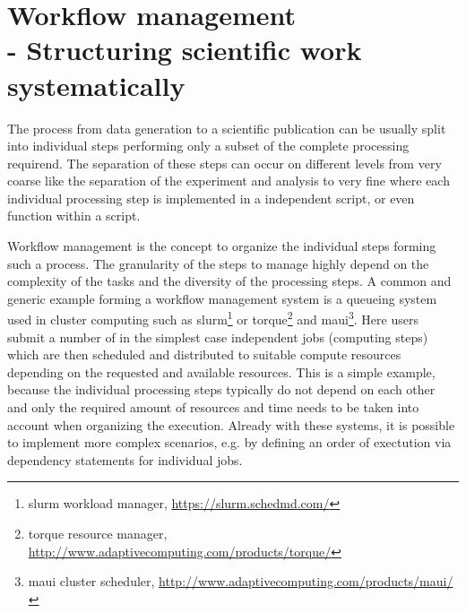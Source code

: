 \clearpage
\chapter[Workflow management]{Workflow management\\- Structuring scientific work systematically}
\label{sec:workflows}
The process from data generation to a scientific publication can be usually split into individual steps performing only a subset of the complete processing requirend. The separation of these steps can occur on different levels from very coarse like the separation of the experiment and analysis to very fine where each individual processing step is implemented in a independent script, or even function within a script.

Workflow management is the concept to organize the individual steps forming such a process. The granularity of the steps to manage highly depend on the complexity of the tasks and the diversity of the processing steps. A common and generic example forming a workflow management system is a queueing system used in cluster computing such as slurm\footnote{slurm workload manager, \url{https://slurm.schedmd.com/}} or torque\footnote{torque resource manager, \url{http://www.adaptivecomputing.com/products/torque/}} and maui\footnote{maui cluster scheduler, \url{http://www.adaptivecomputing.com/products/maui/}}. Here users submit a number of in the simplest case independent jobs (computing steps) which are then scheduled and distributed to suitable compute resources depending on the requested and available resources. This is a simple example, because the individual processing steps typically do not depend on each other and only the required amount of resources and time needs to be taken into account when organizing the execution. Already with these systems, it is possible to implement more complex scenarios, e.g. by defining an order of exectution via dependency statements for individual jobs.

